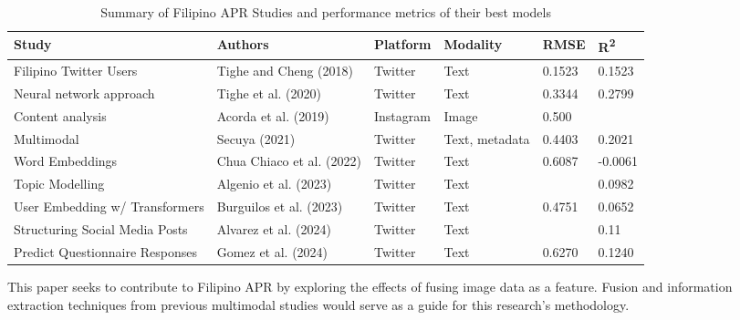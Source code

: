 \begin{table}[ht]
\scriptsize
\centering
\caption{Summary of Filipino APR Studies and performance metrics of their best models}
\label{tab:filipino_apr_summary}
\begin{tabularx}{\textwidth}{@{}l l l l l l@{}}
\toprule
\textbf{Study} & \textbf{Authors} & \textbf{Platform} & \textbf{Modality} & \textbf{RMSE} & \textbf{R\textsuperscript{2}} \\
\midrule
Filipino Twitter Users & Tighe and Cheng (2018) & Twitter & Text & 0.1523 & 0.1523 \\
Neural network approach & Tighe et al. (2020) & Twitter & Text & 0.3344 & 0.2799 \\
Content analysis & Acorda et al. (2019) & Instagram & Image & 0.500 &  \\
Multimodal & Secuya (2021) & Twitter & Text, metadata & 0.4403 & 0.2021 \\
Word Embeddings & Chua Chiaco et al. (2022) & Twitter & Text & 0.6087 & -0.0061 \\
Topic Modelling & Algenio et al. (2023) & Twitter & Text &  & 0.0982 \\
User Embedding w/ Transformers & Burguilos et al. (2023) & Twitter & Text & 0.4751 & 0.0652 \\
Structuring Social Media Posts & Alvarez et al. (2024) & Twitter & Text &  & 0.11 \\
Predict Questionnaire Responses & Gomez et al. (2024) & Twitter & Text & 0.6270 & 0.1240 \\
\bottomrule
\end{tabularx}
\end{table}

This paper seeks to contribute to Filipino APR by exploring the effects of fusing image data as a feature. Fusion and information extraction techniques from previous multimodal studies would serve as a guide for this research’s methodology.




